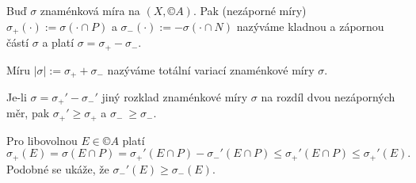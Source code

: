\documentclass[12pt]{article}					%
\begin{document}
\begin{definice}
	Buď $\sigma$ znaménková míra na $(X, ©A)$. Pak (nezáporné míry) $\sigma_+(·) := \sigma(· \cap P)$ a $\sigma_-(·) := - \sigma(· \cap N)$ nazýváme kladnou a zápornou částí $\sigma$ a platí $\sigma = \sigma_+ - \sigma_-$.

	Míru $|\sigma|:= \sigma_+ + \sigma_-$ nazýváme totální variací znaménkové míry $\sigma$.
\end{definice}

\begin{tvrzeni}
	Je-li $\sigma = \sigma_+' - \sigma_-'$ jiný rozklad znaménkové míry $\sigma$ na rozdíl dvou nezáporných měr, pak $\sigma_+' ≥ \sigma_+$ a $\sigma_-\ ≥ \sigma_-$.

	\begin{dukazin}
		Pro libovolnou $E \in ©A$ platí
		$$ \sigma_+(E) = \sigma(E \cap P) = \sigma_+'(E \cap P) - \sigma_-'(E \cap P) ≤ \sigma_+'(E \cap P) ≤ \sigma_+'(E). $$
		Podobné se ukáže, že $\sigma_-'(E) ≥ \sigma_-(E)$.
	\end{dukazin}
\end{tvrzeni}

\end{document}
